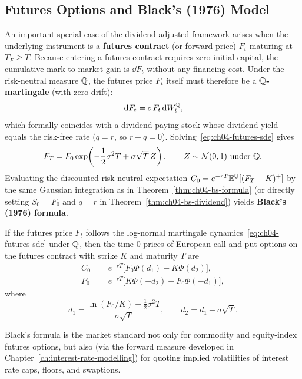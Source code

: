 \subsection{Futures Options and Black's (1976) Model}
\label{sec:ch04-black76}
An important special case of the dividend-adjusted framework arises when the underlying instrument is a \textbf{futures contract} (or forward price) $F_t$ maturing at $T_F \ge T$. Because entering a futures contract requires zero initial capital, the cumulative mark-to-market gain is $\dd F_t$ without any financing cost. Under the risk-neutral measure $\mathbb{Q}$, the futures price $F_t$ itself must therefore be a \textbf{$\mathbb{Q}$-martingale} (with zero drift):
\begin{equation}
    \label{eq:ch04-futures-sde}
    \,\mathrm{d} F_t = \sigma F_t \,\mathrm{d} W_t^{\mathbb{Q}},
\end{equation}
which formally coincides with a dividend-paying stock whose dividend yield equals the risk-free rate ($q = r$, so $r - q = 0$). Solving~\eqref{eq:ch04-futures-sde} gives
\[
    F_T = F_0 \exp\!\left(-\frac{1}{2}\sigma^2 T + \sigma\sqrt{T}\,Z\right), \qquad Z \sim \mathcal{N}(0, 1) \text{ under } \mathbb{Q}.
\]
Evaluating the discounted risk-neutral expectation $C_0 = e^{-rT}\mathbb{E}^{\mathbb{Q}}[(F_T - K)^+]$ by the same Gaussian integration as in Theorem~\ref{thm:ch04-bs-formula} (or directly setting $S_0 = F_0$ and $q = r$ in Theorem~\ref{thm:ch04-bs-dividend}) yields \textbf{Black's (1976) formula}.

\begin{theorem}
    \label{thm:ch04-black76}
    If the futures price $F_t$ follows the log-normal martingale dynamics~\eqref{eq:ch04-futures-sde} under $\mathbb{Q}$, then the time-$0$ prices of European call and put options on the futures contract with strike $K$ and maturity $T$ are
    \begin{align}
        C_0 &= e^{-rT}\bigl[F_0 \Phi(d_1) - K \Phi(d_2)\bigr], \label{eq:ch04-black76-call} \\
        P_0 &= e^{-rT}\bigl[K \Phi(-d_2) - F_0 \Phi(-d_1)\bigr], \label{eq:ch04-black76-put}
    \end{align}
    where
    \[
        d_1 = \frac{\ln(F_0 / K) + \frac{1}{2}\sigma^2 T}{\sigma\sqrt{T}}, \qquad
        d_2 = d_1 - \sigma\sqrt{T}.
    \]
\end{theorem}

Black's formula is the market standard not only for commodity and equity-index futures options, but also (via the forward measure developed in Chapter~\ref{ch:interest-rate-modelling}) for quoting implied volatilities of interest rate caps, floors, and swaptions.

